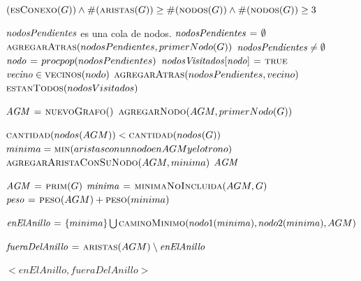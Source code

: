 \begin{codebox}
\li \Return $(\textnormal{\scshape esConexo}(G)) \land
    \textnormal{\scshape\#}(\textnormal{\scshape aristas}(G)) \geq
    \textnormal{\scshape\#}(\textnormal{\scshape nodos}(G)) \land
    \textnormal{\scshape\#}(\textnormal{\scshape nodos}(G)) \geq 3$
\end{codebox}


\vspace*{0.3cm}


\begin{codebox}
\li \Comment $\id{nodosPendientes}$ es una cola de nodos.
\li $\id{nodosPendientes} \gets \emptyset$
\li $\textnormal{\scshape agregarAtras}(nodosPendientes, primerNodo(G))$
\li \While $\id{nodosPendientes} \neq \emptyset$
\li     \Do
\li         $\id{nodo} \gets proc{pop}(nodosPendientes)$
\li         $\id{nodosVisitados[nodo]} \gets \const{true}$
            \For $\id{vecino} \in \proc{vecinos}(nodo)$
\li             \Do
                    $\textnormal{\scshape agregarAtras}(nodosPendientes, vecino)$
                \End
        \End
\li \Return $\textnormal{\scshape estanTodos}(nodosVisitados)$
\end{codebox}


\vspace*{0.3cm}


\begin{codebox}
\li $\id{AGM} \gets \proc{nuevoGrafo}()$
\li $\textnormal{\scshape agregarNodo}(AGM, primerNodo(G))$

\li \While $\textnormal{\scshape cantidad}(nodos(AGM)) < \textnormal{\scshape cantidad}(nodos(G))$
      \Do
\li     $minima = \textnormal{\scshape min}(aristas con un nodo en AGM y el otro no)$
\li     $\textnormal{\scshape agregarAristaConSuNodo}(AGM, minima)$
      \End
\li \Return $\id{AGM}$
\end{codebox}


\vspace*{0.3cm}


\begin{codebox}
\li $\id{AGM} \gets \proc{prim}(G)$
\li $\id{minima} \gets \proc{minimaNoIncluida}(AGM, G)$
\li $\id{peso} \gets \proc{peso}(AGM) + \proc{peso}(minima)$

\li $\id{enElAnillo} \gets \{minima\} \bigcup \proc{caminoMinimo}(nodo1(minima), nodo2(minima), AGM)$

\li $\id{fueraDelAnillo} \gets \proc{aristas}(AGM) \setminus \id{enElAnillo}$

\li \Return $< enElAnillo, fueraDelAnillo >$
\end{codebox}

